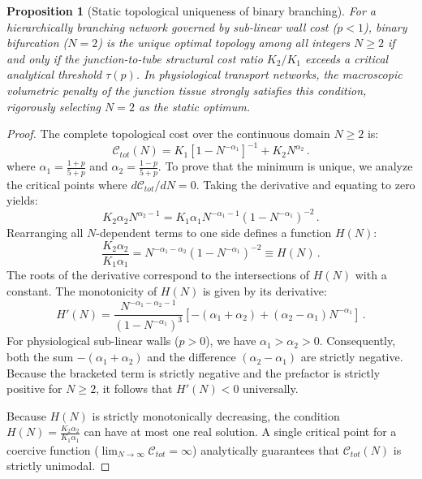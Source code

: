 \documentclass[11pt,a4paper]{article}
\newtheorem{proposition}[theorem]{Proposition}
\theoremstyle{remark}
\begin{document}
\begin{proposition}[Static topological uniqueness of binary branching]
\label{prop:keff}
For a hierarchically branching network governed by sub-linear wall cost ($p<1$),
binary bifurcation ($N=2$) is the unique optimal topology among all integers $N
\ge 2$ if and only if the junction-to-tube structural cost ratio $K_2/K_1$
exceeds a critical analytical threshold $\tau(p)$. In physiological transport
networks, the macroscopic volumetric penalty of the junction tissue strongly
satisfies this condition, rigorously selecting $N=2$ as the static optimum.
\end{proposition}

\begin{proof}
The complete topological cost over the continuous domain $N \ge 2$ is:
\[ \mathcal{C}_{tot}(N) = K_1 \left[ 1 - N^{-\alpha_1} \right]^{-1} + K_2 N^{\alpha_2} \,. \]
where $\alpha_1 = \frac{1+p}{5+p}$ and $\alpha_2 = \frac{1-p}{5+p}$.
To prove that the minimum is unique, we analyze the critical points where
$d\mathcal{C}_{tot}/dN = 0$. Taking the derivative and equating to zero yields:
\[ K_2 \alpha_2 N^{\alpha_2 - 1} = K_1 \alpha_1 N^{-\alpha_1 - 1} \left(1 - N^{-\alpha_1}\right)^{-2} \,. \]
Rearranging all $N$-dependent terms to one side defines a function $H(N)$:
\[ \frac{K_2 \alpha_2}{K_1 \alpha_1} = N^{-\alpha_1 - \alpha_2} \left(1 - N^{-\alpha_1}\right)^{-2} \equiv H(N) \,. \]
The roots of the derivative correspond to the intersections of $H(N)$ with a
constant. The monotonicity of $H(N)$ is given by its derivative:
\[ H'(N) = \frac{N^{-\alpha_1 - \alpha_2 - 1}}{(1 - N^{-\alpha_1})^3} \left[ -(\alpha_1 + \alpha_2) + (\alpha_2 - \alpha_1)N^{-\alpha_1} \right] \,. \]
For physiological sub-linear walls ($p > 0$), we have $\alpha_1 > \alpha_2 > 0$.
Consequently, both the sum $-(\alpha_1 + \alpha_2)$ and the difference
$(\alpha_2 - \alpha_1)$ are strictly negative. Because the bracketed term is
strictly negative and the prefactor is strictly positive for $N \ge 2$, it
follows that $H'(N) < 0$ universally.

Because $H(N)$ is strictly monotonically decreasing, the condition $H(N) =
\frac{K_2 \alpha_2}{K_1 \alpha_1}$ can have at most one real solution. A single
critical point for a coercive function ($\lim_{N \to \infty} \mathcal{C}_{tot} =
\infty$) analytically guarantees that $\mathcal{C}_{tot}(N)$ is strictly
unimodal.


\end{proof}
\end{document}
